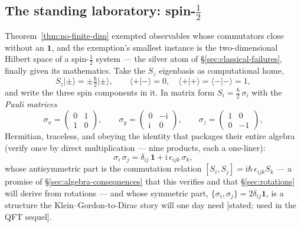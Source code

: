 \documentclass[11pt]{article}
\theoremstyle{plain}
\theoremstyle{definition}
\theoremstyle{remark}
\newcommand{\ii}{\mathrm{i}}
\newcommand{\idop}{\mathbf{1}}  %
\newcommand{\ket}[1]{\lvert #1 \rangle}
\newcommand{\braket}[2]{\langle #1 | #2 \rangle}
\begin{document}
\subsection{The standing laboratory: spin-$\tfrac12$}
\label{sec:spin-half}

Theorem~\ref{thm:no-finite-dim} exempted observables whose
commutators close without an $\idop$, and the exemption's smallest
instance is the two-dimensional Hilbert space of a spin-$\tfrac12$
system --- the silver atom of \S\ref{sec:classical-failures},
finally given its mathematics. Take the $S_z$ eigenbasis as
computational home,
\begin{equation}
  S_z\ket\pm = \pm\tfrac\hbar2\ket\pm,
  \qquad
  \braket+- = 0,\quad \braket++ = \braket-- = 1,
\end{equation}
and write the three spin components in it. In matrix form
$S_i = \tfrac\hbar2\,\sigma_i$ with the \emph{Pauli matrices}
\begin{equation}
  \sigma_x = \begin{pmatrix} 0 & 1 \\ 1 & 0 \end{pmatrix},
  \qquad
  \sigma_y = \begin{pmatrix} 0 & -\ii \\ \ii & 0 \end{pmatrix},
  \qquad
  \sigma_z = \begin{pmatrix} 1 & 0 \\ 0 & -1 \end{pmatrix},
  \label{eq:pauli}
\end{equation}
Hermitian, traceless, and obeying the identity that packages their
entire algebra (verify once by direct multiplication --- nine
products, each a one-liner):
\begin{equation}
  \boxed{\;
  \sigma_i\,\sigma_j
  = \delta_{ij}\,\idop + \ii\,\epsilon_{ijk}\,\sigma_k ,
  \;}
  \label{eq:pauli-algebra}
\end{equation}
whose antisymmetric part is the commutation relation
$[S_i, S_j] = \ii\hbar\,\epsilon_{ijk} S_k$ --- a promise of
\S\ref{sec:algebra-consequences} that this verifies and that
\S\ref{sec:rotations} will derive from rotations --- and whose symmetric part,
$\{\sigma_i, \sigma_j\} = 2\delta_{ij}\idop$, is a structure the
Klein--Gordon-to-Dirac story will one day need [stated; used in the
QFT sequel].
\end{document}
